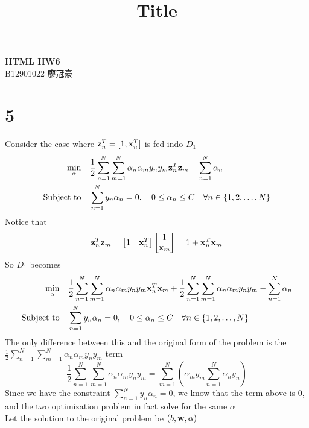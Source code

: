 \documentclass[11pt]{article}
\theoremstyle{definition}
\begin{document}
\setcounter{section}{0}
\title{Title}

\thispagestyle{empty}
\begin{center}
  {\large \bf HTML HW6} \\ 
  B12901022 廖冠豪
\end{center}
\section*{5}
Consider the case where $\vb{z}_n^T = [1, \vb{x}_n^T]$ is fed indo $D_1$
\begin{align*}
  \min_{\vb{\alpha}}\quad&\frac{1}{2}\sum^N_{n = 1}\sum^N_{m = 1}\alpha_n\alpha_my_ny_m\vb{z}_n^T\vb{z}_m - \sum_{n = 1}^N\alpha_n \\ 
  \text{Subject to}\quad &\sum^N_{n = 1}y_n\alpha_n = 0, \quad 0 \leq \alpha_n \leq C\quad\forall n \in \{1, 2,\dots,N\}
\end{align*}
Notice that
\[
  \vb{z}_n^T\vb{z}_m = \begin{bmatrix}1 &\vb{x}_n^T\end{bmatrix}\begin{bmatrix}1 \\ \vb{x}_m\end{bmatrix} = 1 + \vb{x}_n^T\vb{x}_m
\]
So $D_1$ becomes
\begin{align*}
  \min_{\vb{\alpha}}\quad&\frac{1}{2}\sum^N_{n = 1}\sum^N_{m = 1}\alpha_n\alpha_my_ny_m\vb{x}_n^T\vb{x}_m + \frac{1}{2}\sum^N_{n = 1}\sum^N_{m = 1}\alpha_n\alpha_my_ny_m - \sum_{n = 1}^N\alpha_n \\ 
  \text{Subject to}\quad &\sum^N_{n = 1}y_n\alpha_n = 0, \quad 0 \leq \alpha_n \leq C\quad\forall n \in \{1, 2,\dots,N\} \\
\end{align*}
The only difference between this and the original form of the problem is the $\frac{1}{2}\sum^N_{n = 1}\sum^N_{m = 1}\alpha_n\alpha_my_ny_m$ term
\[
  \frac{1}{2}\sum^N_{n = 1}\sum^N_{m = 1}\alpha_n\alpha_my_ny_m = \sum^N_{m = 1}\left(\alpha_my_m\sum^N_{n = 1}\alpha_ny_n\right)
\]
Since we have the constraint $\sum^N_{n = 1}y_n\alpha_n = 0$, we know that the term above is $0$, and the two optimization problem in fact solve for the same $\alpha$ \\ 
Let the solution to the original problem be $(b, \vb{w}, \alpha)$
\end{document}
